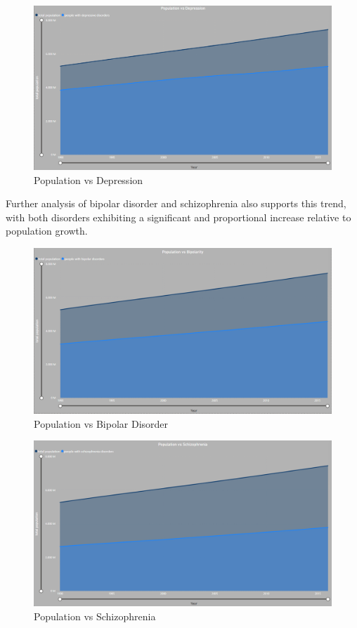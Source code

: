 \documentclass[runningheads]{llncs}
\begin{document}
\begin{figure}[ht!]
    \centering
    \includegraphics[width=\textwidth]{./imgs/depress.png}
    \caption{Population vs Depression}
    \label{fig:depress}
\end{figure}

Further analysis of bipolar disorder and schizophrenia also supports this trend, with both disorders exhibiting a significant and proportional increase relative to population growth. 

\begin{figure}[ht!]
    \centering
    \includegraphics[width=\textwidth]{./imgs/bipolar.png}
    \caption{Population vs Bipolar Disorder}
    \label{fig:bipolar}
\end{figure}

\begin{figure}[ht!]
    \centering
    \includegraphics[width=\textwidth]{./imgs/schizo.png}
    \caption{Population vs Schizophrenia}
    \label{fig:schizo}
\end{figure}
\end{document}
